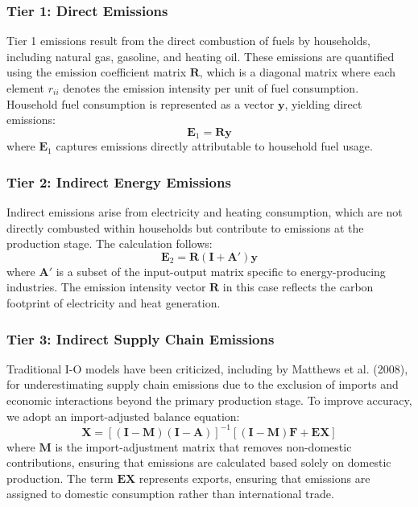 \documentclass[12pt,a4paper]{article}%
\begin{document}
\subsubsection*{Tier 1: Direct Emissions}
Tier 1 emissions result from the direct combustion of fuels by households, including natural gas, gasoline, and heating oil. These emissions are quantified using the emission coefficient matrix \( \mathbf{R} \), which is a diagonal matrix where each element \( r_{ii} \) denotes the emission intensity per unit of fuel consumption. Household fuel consumption is represented as a vector \( \mathbf{y} \), yielding direct emissions:
\begin{equation}
    \mathbf{E}_1 = \mathbf{R} \mathbf{y}
\end{equation}
where \( \mathbf{E}_1 \) captures emissions directly attributable to household fuel usage.

\subsubsection*{Tier 2: Indirect Energy Emissions}
Indirect emissions arise from electricity and heating consumption, which are not directly combusted within households but contribute to emissions at the production stage. The calculation follows:
\begin{equation}
    \mathbf{E}_2 = \mathbf{R} (\mathbf{I} + \mathbf{A}') \mathbf{y}
\end{equation}
where \( \mathbf{A}' \) is a subset of the input-output matrix specific to energy-producing industries. The emission intensity vector \( \mathbf{R} \) in this case reflects the carbon footprint of electricity and heat generation.

\subsubsection*{Tier 3: Indirect Supply Chain Emissions}
Traditional I-O models have been criticized, including by Matthews et al. (2008), for underestimating supply chain emissions due to the exclusion of imports and economic interactions beyond the primary production stage. To improve accuracy, we adopt an import-adjusted balance equation:
\begin{equation}
    \mathbf{X} = [(\mathbf{I} - \mathbf{M}) (\mathbf{I} - \mathbf{A})]^{-1} [(\mathbf{I} - \mathbf{M}) \mathbf{F} + \mathbf{EX}]
\end{equation}
where \( \mathbf{M} \) is the import-adjustment matrix that removes non-domestic contributions, ensuring that emissions are calculated based solely on domestic production. The term \( \mathbf{EX} \) represents exports, ensuring that emissions are assigned to domestic consumption rather than international trade.
\end{document}
